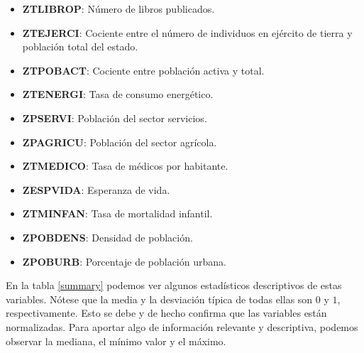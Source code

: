 \documentclass[letterpaper,11pt]{article}
\begin{document}
\begin{itemize}
    \item \textbf{ZTLIBROP}: Número de libros publicados.
    \item \textbf{ZTEJERCI}: Cociente entre el número de individuos en ejército de tierra y población total del estado.
    \item \textbf{ZTPOBACT}: Cociente entre población activa y total.
    \item \textbf{ZTENERGI}: Tasa de consumo energético.
    \item \textbf{ZPSERVI}: Población del sector servicios.
    \item \textbf{ZPAGRICU}: Población del sector agrícola.
    \item \textbf{ZTMEDICO}: Tasa de médicos por habitante.
    \item \textbf{ZESPVIDA}: Esperanza de vida.
    \item \textbf{ZTMINFAN}: Tasa de mortalidad infantil.
    \item \textbf{ZPOBDENS}: Densidad de población.
    \item \textbf{ZPOBURB}: Porcentaje de población urbana.
\end{itemize}

En la tabla \ref{summary} podemos ver algunos estadísticos descriptivos de estas variables. Nótese que la media y la desviación típica de todas ellas son $0$ y $1$, respectivamente. Esto se debe y de hecho confirma que las variables están normalizadas. Para aportar algo de información relevante y descriptiva, podemos observar la mediana, el mínimo valor y el máximo.
\end{document}
